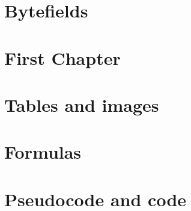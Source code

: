 \thispagestyle{empty} %
\cleardoublepage

\thispagestyle{empty}

\clearpage{\pagestyle{plain}\cleardoublepage}


\clearpage{\pagestyle{plain}\cleardoublepage}
\tableofcontents %

\clearpage{\pagestyle{plain}\cleardoublepage} %

\clearpage{\pagestyle{plain}\cleardoublepage} %
\chapter{Bytefields} %
\label{chapter:bytefields} %


\clearpage{\pagestyle{plain}\cleardoublepage} %
\chapter{First Chapter} %
\label{chapter:primo_capitolo} %

\clearpage{\pagestyle{plain}\cleardoublepage}
\chapter{Tables and images}
\label{chapter:immagini_e_tabelle}


\clearpage{\pagestyle{plain}\cleardoublepage}
\chapter{Formulas}
\label{chapter:formule}


\clearpage{\pagestyle{plain}\cleardoublepage}
\chapter{Pseudocode and code}
\label{chapter:codice}


\clearpage{\pagestyle{plain}\cleardoublepage}


